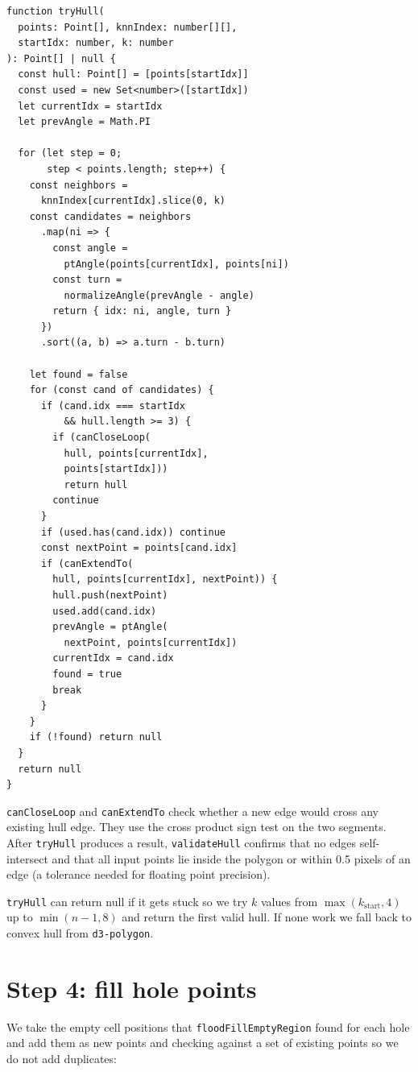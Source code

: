 \documentclass[12pt]{extreport}
\begin{document}
\begin{lstlisting}[style=tsstyle, caption={One concave hull attempt (\texttt{geometry.ts})}]
function tryHull(
  points: Point[], knnIndex: number[][],
  startIdx: number, k: number
): Point[] | null {
  const hull: Point[] = [points[startIdx]]
  const used = new Set<number>([startIdx])
  let currentIdx = startIdx
  let prevAngle = Math.PI

  for (let step = 0;
       step < points.length; step++) {
    const neighbors =
      knnIndex[currentIdx].slice(0, k)
    const candidates = neighbors
      .map(ni => {
        const angle =
          ptAngle(points[currentIdx], points[ni])
        const turn =
          normalizeAngle(prevAngle - angle)
        return { idx: ni, angle, turn }
      })
      .sort((a, b) => a.turn - b.turn)

    let found = false
    for (const cand of candidates) {
      if (cand.idx === startIdx
          && hull.length >= 3) {
        if (canCloseLoop(
          hull, points[currentIdx],
          points[startIdx]))
          return hull
        continue
      }
      if (used.has(cand.idx)) continue
      const nextPoint = points[cand.idx]
      if (canExtendTo(
        hull, points[currentIdx], nextPoint)) {
        hull.push(nextPoint)
        used.add(cand.idx)
        prevAngle = ptAngle(
          nextPoint, points[currentIdx])
        currentIdx = cand.idx
        found = true
        break
      }
    }
    if (!found) return null
  }
  return null
}
\end{lstlisting}

\texttt{canCloseLoop} and \texttt{canExtendTo} check whether a new edge would cross any existing hull edge. They use the cross product sign test on the two segments. After \texttt{tryHull} produces a result, \texttt{validateHull} confirms that no edges self-intersect and that all input points lie inside the polygon or within 0.5 pixels of an edge (a tolerance needed for floating point precision).

\texttt{tryHull} can return null if it gets stuck so we try $k$ values from $\max(k_\text{start}, 4)$ up to $\min(n-1, 8)$ and return the first valid hull. If none work we fall back to convex hull from \texttt{d3-polygon}.

\section{Step 4: fill hole points}

We take the empty cell positions that \texttt{floodFillEmptyRegion} found for each hole and add them as new points and checking against a set of existing points so we do not add duplicates:
\end{document}
